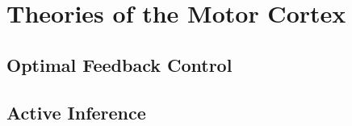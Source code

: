 \section{Theories of the Motor Cortex}

\subsection{Optimal Feedback Control}

\subsection{Active Inference}
